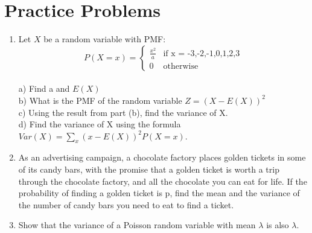 \documentclass[11pt]{article}
\begin{document}
\section{Practice Problems}
\begin{enumerate}
  \item Let $X$ be a random variable with PMF:
  \begin{equation*}
    P(X=x) = 
    \begin{cases}
    \frac{x^2}{a} & \text{if x = -3,-2,-1,0,1,2,3} \\ 
    0 & \text{otherwise}
    \end{cases}
  \end{equation*}
  \\ a) Find a and $E(X)$
  \\ b) What is the PMF of the random variable $Z = (X - E(X))^2$
  \\ c) Using the result from part (b), find the variance of X.
  \\ d) Find the variance of X using the formula $Var(X) = \sum_{x} (x - E(X))^2P(X=x)$.
  \item As an advertising campaign, a chocolate factory places golden tickets in some of its candy bars, with the promise that a golden ticket is worth a trip through the chocolate factory, and all the chocolate you can eat for life. If the probability of finding a golden ticket is p, find the mean and the variance of the number of candy bars you need to eat to find a ticket.
  \item Show that the variance of a Poisson random variable with mean $\lambda$ is also $\lambda$.
\end{enumerate}
\end{document}
